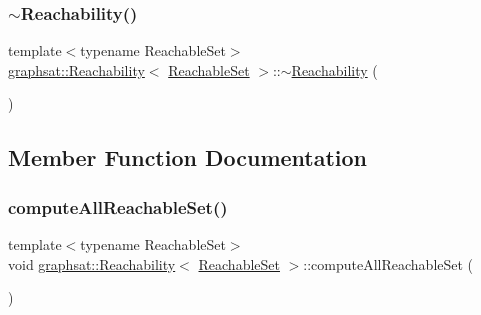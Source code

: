 \subsubsection{\texorpdfstring{$\sim$Reachability()}{~Reachability()}}
{\footnotesize\ttfamily template$<$typename Reachable\+Set$>$ \\
\mbox{\hyperlink{classgraphsat_1_1_reachability}{graphsat\+::\+Reachability}}$<$ \mbox{\hyperlink{classgraphsat_1_1_reachable_set}{Reachable\+Set}} $>$\+::$\sim$\mbox{\hyperlink{classgraphsat_1_1_reachability}{Reachability}} (\begin{DoxyParamCaption}{ }\end{DoxyParamCaption})\hspace{0.3cm}{\ttfamily [inline]}}



\subsection{Member Function Documentation}
\mbox{\label{classgraphsat_1_1_reachability_a1fc3182356898a032d6dfac91e302b71}} 
\subsubsection{\texorpdfstring{computeAllReachableSet()}{computeAllReachableSet()}}
{\footnotesize\ttfamily template$<$typename Reachable\+Set$>$ \\
void \mbox{\hyperlink{classgraphsat_1_1_reachability}{graphsat\+::\+Reachability}}$<$ \mbox{\hyperlink{classgraphsat_1_1_reachable_set}{Reachable\+Set}} $>$\+::compute\+All\+Reachable\+Set (\begin{DoxyParamCaption}{ }\end{DoxyParamCaption})\hspace{0.3cm}{\ttfamily [inline]}}

